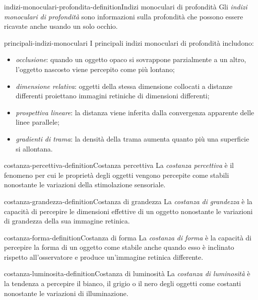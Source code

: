 \documentclass[preview]{standalone}
\begin{document}
\begin{snippetdefinition}{indizi-monoculari-profondita-definition}{Indizi monoculari di profondità}
    Gli \emph{indizi monoculari di profondità} sono informazioni sulla
    profondità che possono essere ricavate anche usando un solo occhio.
\end{snippetdefinition}

\begin{snippet}{principali-indizi-monoculari}
    I principali indizi monoculari di profondità includono:
    \begin{itemize}
        \item \emph{occlusione}: quando un oggetto opaco si sovrappone
        parzialmente a un altro, l'oggetto nascosto viene percepito come più
        lontano;
        \item \emph{dimensione relativa}: oggetti della stessa dimensione
        collocati a distanze differenti proiettano immagini retiniche di
        dimensioni differenti;
        \item \emph{prospettiva lineare}: la distanza viene inferita dalla
        convergenza apparente delle linee parallele;
        \item \emph{gradienti di trama}: la densità della trama aumenta quanto
        più una superficie si allontana.
    \end{itemize}
\end{snippet}

\begin{snippetdefinition}{costanza-percettiva-definition}{Costanza percettiva}
    La \emph{costanza percettiva} è il fenomeno per cui le proprietà degli
    oggetti vengono percepite come stabili nonostante le variazioni della
    stimolazione sensoriale.
\end{snippetdefinition}

\begin{snippetdefinition}{costanza-grandezza-definition}{Costanza di grandezza}
    La \emph{costanza di grandezza} è la capacità di percepire le dimensioni
    effettive di un oggetto nonostante le variazioni di grandezza della sua
    immagine retinica.
\end{snippetdefinition}

\begin{snippetdefinition}{costanza-forma-definition}{Costanza di forma}
    La \emph{costanza di forma} è la capacità di percepire la forma di un
    oggetto come stabile anche quando esso è inclinato rispetto all'osservatore
    e produce un'immagine retinica differente.
\end{snippetdefinition}

\begin{snippetdefinition}{costanza-luminosita-definition}{Costanza di luminosità}
    La \emph{costanza di luminosità} è la tendenza a percepire il bianco, il
    grigio o il nero degli oggetti come costanti nonostante le variazioni di
    illuminazione.
\end{snippetdefinition}
\end{document}
